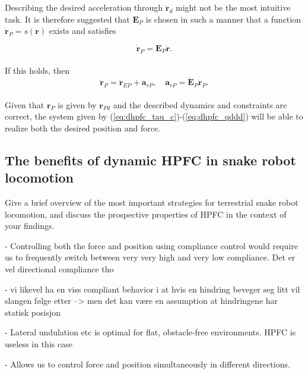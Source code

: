 Describing the desired acceleration through $\mathbf{\ddot{r}}_d$ might not be the most intuitive task. It is therefore suggested that $\mathbf{E}_P$ is chosen in such a manner that a function $\mathbf{\dot{r}}_P = s(\mathbf{r})$ exists and satisfies

\begin{equation}
    \mathbf{\dot{r}}_P = \mathbf{E}_P \mathbf{\dot{r}}.
\end{equation}
\\
If this holds, then
\begin{equation}
    \mathbf{\ddot{r}}_P = \mathbf{\ddot{r}}_{EP} + \mathbf{a}_{rP}, \quad \mathbf{a}_{rP} = \mathbf{\dot{E}}_P \mathbf{\dot{r}}_P.
\end{equation}
\\
Given that $\mathbf{r}_{P}$ is given by $\mathbf{r}_{Pd}$ and the described dynamics and constraints are correct, the system given by (\ref{eq:dhpfc_tau_c})-(\ref{eq:dhpfc_qddd}) will be able to realize both the desired position and force.



\subsection{The benefits of dynamic HPFC in snake robot locomotion}

Give a brief overview of the most important strategies for terrestrial snake robot locomotion, and
discuss the prospective properties of HPFC in the context of your findings.

- Controlling both the force and position using compliance control would require us to frequently switch between very very high and very low compliance. Det er vel directional compliance tho

- vi likevel ha en viss compliant behavior i at hvis en hindring beveger seg litt vil slangen følge etter --> men det kan være en assumption at hindringene har statisk posisjon

- Lateral undulation etc is optimal for flat, obstacle-free environments. HPFC is useless in this case

- Allows us to control force and position simultaneously in different directions.


